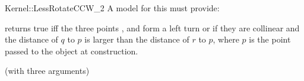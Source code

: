\begin{ccRefFunctionObjectConcept}{Kernel::LessRotateCCW_2}
A model for this must provide:


{returns true iff the three points ,  
and  form a left turn or if they are collinear and
the distance of $q$ to $p$ is
larger than the distance of $r$ to $p$, where $p$ is the point
passed to the object at construction.
}

\ccRefines
{} (with three arguments)

\end{ccRefFunctionObjectConcept}
